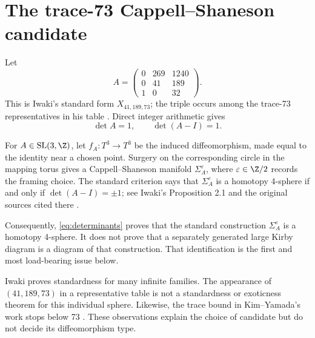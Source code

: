 \section{The trace-73 Cappell--Shaneson candidate}

Let
\begin{equation}\label{eq:A}
A=\begin{pmatrix}
0&269&1240\\
0&41&189\\
1&0&32
\end{pmatrix}.
\end{equation}
This is Iwaki's standard form $X_{41,189,73}$; the triple occurs among the
trace-73 representatives in his table \cite[Table 2]{Iwaki2024}.  Direct
integer arithmetic gives
\begin{equation}\label{eq:determinants}
\det A=1,\qquad \det(A-I)=1.
\end{equation}

For $A\in \operatorname{SL}(3,\Z)$, let $f_A:T^3\to T^3$ be the induced
diffeomorphism, made equal to the identity near a chosen point.  Surgery on
the corresponding circle in the mapping torus gives a
Cappell--Shaneson manifold $\Sigma_A^\varepsilon$, where
$\varepsilon\in\Z/2$ records the framing choice.  The standard criterion says
that $\Sigma_A^\varepsilon$ is a homotopy 4-sphere if and only if
$\det(A-I)=\pm1$; see Iwaki's Proposition 2.1 and the original sources cited
there \cite{Iwaki2024,CappellShaneson1976}.

Consequently, \eqref{eq:determinants} proves that the standard construction
$\Sigma_A^\varepsilon$ is a homotopy 4-sphere.  It does not prove that a
separately generated large Kirby diagram is a diagram of that construction.
That identification is the first and most load-bearing issue below.

Iwaki proves standardness for many infinite families.  The appearance of
$(41,189,73)$ in a representative table is not a standardness or exoticness
theorem for this individual sphere.  Likewise, the trace bound in
Kim--Yamada's work stops below 73 \cite{KimYamada2017}.  These observations
explain the choice of candidate but do not decide its diffeomorphism type.

